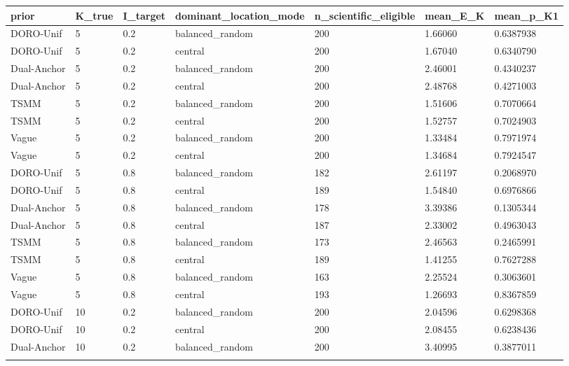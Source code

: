 \begin{longtable}{lllllll}
\toprule
prior & K\_true & I\_target & dominant\_location\_mode & n\_scientific\_eligible & mean\_E\_K & mean\_p\_K1 \\
\midrule\endhead
DORO-Unif & 5 & 0.2 & balanced\_random & 200 & 1.66060 & 0.6387938 \\ \addlinespace[3pt]
DORO-Unif & 5 & 0.2 & central & 200 & 1.67040 & 0.6340790 \\ \addlinespace[3pt]
Dual-Anchor & 5 & 0.2 & balanced\_random & 200 & 2.46001 & 0.4340237 \\ \addlinespace[3pt]
Dual-Anchor & 5 & 0.2 & central & 200 & 2.48768 & 0.4271003 \\ \addlinespace[3pt]
TSMM & 5 & 0.2 & balanced\_random & 200 & 1.51606 & 0.7070664 \\ \addlinespace[3pt]
TSMM & 5 & 0.2 & central & 200 & 1.52757 & 0.7024903 \\ \addlinespace[3pt]
Vague & 5 & 0.2 & balanced\_random & 200 & 1.33484 & 0.7971974 \\ \addlinespace[3pt]
Vague & 5 & 0.2 & central & 200 & 1.34684 & 0.7924547 \\ \addlinespace[3pt]
DORO-Unif & 5 & 0.8 & balanced\_random & 182 & 2.61197 & 0.2068970 \\ \addlinespace[3pt]
DORO-Unif & 5 & 0.8 & central & 189 & 1.54840 & 0.6976866 \\ \addlinespace[3pt]
Dual-Anchor & 5 & 0.8 & balanced\_random & 178 & 3.39386 & 0.1305344 \\ \addlinespace[3pt]
Dual-Anchor & 5 & 0.8 & central & 187 & 2.33002 & 0.4963043 \\ \addlinespace[3pt]
TSMM & 5 & 0.8 & balanced\_random & 173 & 2.46563 & 0.2465991 \\ \addlinespace[3pt]
TSMM & 5 & 0.8 & central & 189 & 1.41255 & 0.7627288 \\ \addlinespace[3pt]
Vague & 5 & 0.8 & balanced\_random & 163 & 2.25524 & 0.3063601 \\ \addlinespace[3pt]
Vague & 5 & 0.8 & central & 193 & 1.26693 & 0.8367859 \\ \addlinespace[3pt]
DORO-Unif & 10 & 0.2 & balanced\_random & 200 & 2.04596 & 0.6298368 \\ \addlinespace[3pt]
DORO-Unif & 10 & 0.2 & central & 200 & 2.08455 & 0.6238436 \\ \addlinespace[3pt]
Dual-Anchor & 10 & 0.2 & balanced\_random & 200 & 3.40995 & 0.3877011 \\ \addlinespace[3pt]

\end{longtable}
